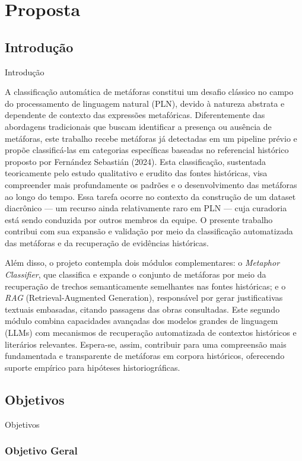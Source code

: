 \providecommand{\tightlist}{}
\chapter{Proposta}
\section{\textbf{Introdução}}{Introdução}\label{introduuxe7uxe3o}

A classificação automática de metáforas constitui um desafio clássico no
campo do processamento de linguagem natural (PLN), devido à natureza
abstrata e dependente de contexto das expressões metafóricas.
Diferentemente das abordagens tradicionais que buscam identificar a
presença ou ausência de metáforas, este trabalho recebe metáforas já
detectadas em um pipeline prévio e propõe classificá-las em categorias
específicas baseadas no referencial histórico proposto por Fernández
Sebastián (2024). Esta classificação, sustentada teoricamente pelo
estudo qualitativo e erudito das fontes históricas, visa compreender
mais profundamente os padrões e o desenvolvimento das metáforas ao longo
do tempo. Essa tarefa ocorre no contexto da construção de um dataset
diacrônico --- um recurso ainda relativamente raro em PLN --- cuja
curadoria está sendo conduzida por outros membros da equipe. O presente
trabalho contribui com sua expansão e validação por meio da
classificação automatizada das metáforas e da recuperação de evidências
históricas.

Além disso, o projeto contempla dois módulos complementares: o
\emph{Metaphor Classifier}, que classifica e expande o conjunto de
metáforas por meio da recuperação de trechos semanticamente semelhantes
nas fontes históricas; e o \emph{RAG} (Retrieval-Augmented Generation),
responsável por gerar justificativas textuais embasadas, citando
passagens das obras consultadas. Este segundo módulo combina capacidades
avançadas dos modelos grandes de linguagem (LLMs) com mecanismos de
recuperação automatizada de contextos históricos e literários
relevantes. Espera-se, assim, contribuir para uma compreensão mais
fundamentada e transparente de metáforas em corpora históricos,
oferecendo suporte empírico para hipóteses historiográficas.

\section{\textbf{Objetivos}}{Objetivos}\label{objetivos}

\subsection{\texorpdfstring{\textbf{Objetivo
Geral}}{Objetivo Geral}}\label{objetivo-geral}

